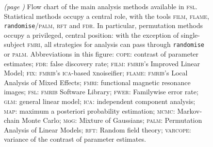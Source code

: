 \begin{figure}[!b]
\caption[Flow chart of the main analysis methods available in \textsc{fsl}.]{\emph{(page \pageref{fig:fsl_noref})} Flow chart of the main analysis methods available in \textsc{fsl}. Statistical methods occupy a central role, with the tools \textsc{film}, \textsc{flame}, \texttt{randomise}/\textsc{palm}, \textsc{rft} and \textsc{fdr}. In particular, permutation methods occupy a privileged, central position: with the exception of single-subject \textsc{fmri}, all strategies for analysis can pass through \texttt{randomise} or \textsc{palm}.
Abbreviations in this figure:
\textsc{cope}: contrast of parameter estimates;
\textsc{fdr}: false discovery rate;
\textsc{film}: \textsc{fmrib}'s Improved Linear Model;
\textsc{fix}: \textsc{fmrib}'s \textsc{ica}-based \textsc{x}noiseifier;
\textsc{flame}: \textsc{fmrib}'s Local Analysis of Mixed Effects;
\textsc{fmri}: functional magnetic resonance images;
\textsc{fsl}: \textsc{fmrib} Software Library;
\textsc{fwer}: Familywise error rate;
\textsc{glm}: general linear model;
\textsc{ica}: independent component analysis;
\textsc{map}: maximum a posteriori probability estimation;
\textsc{mcmc}: Markov-chain Monte Carlo;
\textsc{m}o\textsc{g}: Mixture of Gaussians;
\textsc{palm}: Permutation Analysis of Linear Models;
\textsc{rft}: Random field theory;
\textsc{varcope}: variance of the contrast of parameter estimates.}
\label{fig:fsl}
\end{figure}

